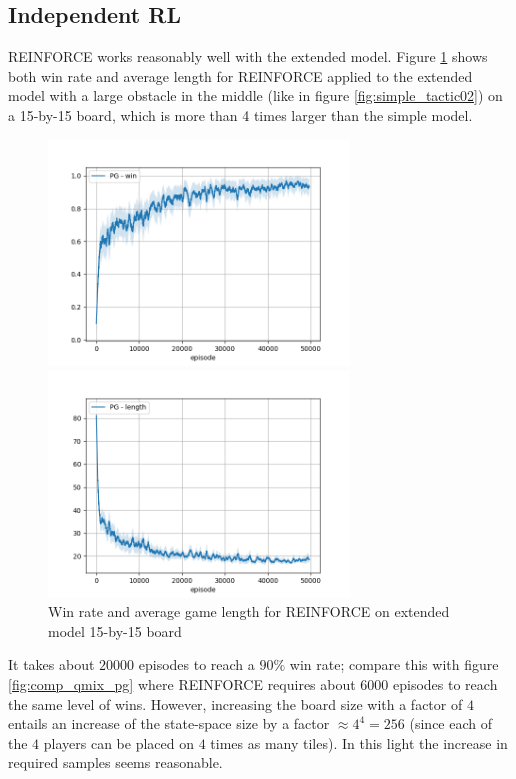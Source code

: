 \subsection{Independent RL}
REINFORCE works reasonably well with the extended model. Figure \ref{fig:pg_extended} shows both win rate and average length for REINFORCE applied to the extended model with a large obstacle in the middle (like in figure \ref{fig:simple_tactic02}) on a 15-by-15 board, which is more than 4 times larger than the simple model. 
\begin{figure}[htp]
\centering
\begin{minipage}{.45\textwidth}
  \centering
  \includegraphics[width=8cm]{images/experiment6/pg_win_15.png}
\end{minipage}%
\begin{minipage}{.05\textwidth}
\centering
  \caption*{ }
\end{minipage}%
\begin{minipage}{.45\textwidth}
  \centering
  \includegraphics[width=8cm]{images/experiment6/pg_length_15.png}
\end{minipage}
\caption{Win rate and average game length for REINFORCE on extended model 15-by-15 board}
\label{fig:pg_extended}
\end{figure}
It takes about $20000$ episodes to reach a $90\%$ win rate; compare this with figure \ref{fig:comp_qmix_pg} where REINFORCE requires about $6000$ episodes to reach the same level of wins. However, increasing the board size with a factor of $4$ entails an increase of the state-space size by a factor $\approx 4^4 = 256$ (since each of the $4$ players can be placed on $4$ times as many tiles). In this light the increase in required samples seems reasonable.\\
